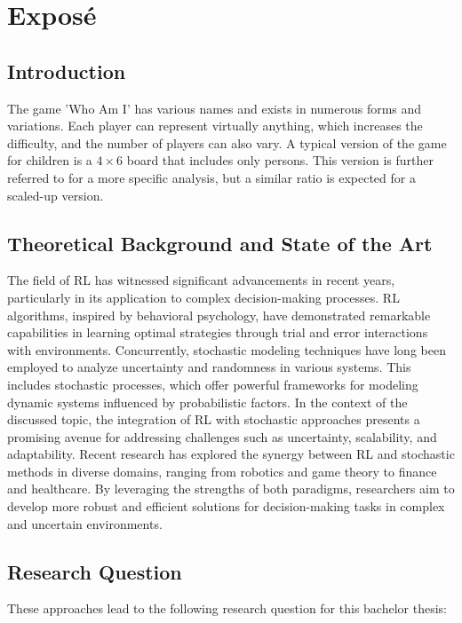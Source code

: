 \chapter{Exposé}

\section{Introduction}

The game 'Who Am I' has various names and exists in numerous forms and variations. Each player can represent virtually anything, which increases the difficulty, and the number of players can also vary. A typical version of the game for children is a $4 \times 6$ board that includes only persons. This version is further referred to for a more specific analysis, but a similar ratio is expected for a scaled-up version.

\section{Theoretical Background and State of the Art}
\label{sec:state-of-the-art}

The field of RL has witnessed significant advancements in recent years, particularly in its application to complex decision-making processes. RL algorithms, inspired by behavioral psychology, have demonstrated remarkable capabilities in learning optimal strategies through trial and error interactions with environments. Concurrently, stochastic modeling techniques have long been employed to analyze uncertainty and randomness in various systems. This includes stochastic processes, which offer powerful frameworks for modeling dynamic systems influenced by probabilistic factors. In the context of the discussed topic, the integration of RL with stochastic approaches presents a promising avenue for addressing challenges such as uncertainty, scalability, and adaptability. Recent research has explored the synergy between RL and stochastic methods in diverse domains, ranging from robotics and game theory to finance and healthcare. By leveraging the strengths of both paradigms, researchers aim to develop more robust and efficient solutions for decision-making tasks in complex and uncertain environments.


\section{Research Question}

These approaches lead to the following research question for this bachelor
thesis:

